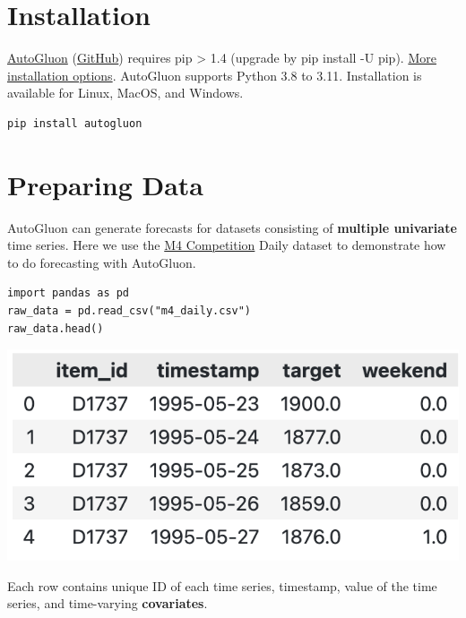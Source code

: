 \section*{Installation}
\href{https://auto.gluon.ai/stable/index.html}{AutoGluon} (\href{https://github.com/autogluon/autogluon/}{GitHub}) requires pip > 1.4 (upgrade by pip install -U pip). \href{https://auto.gluon.ai/stable/install.html}{More installation options}. AutoGluon supports Python 3.8 to 3.11. Installation is available for Linux, MacOS, and Windows.

\begin{verbatim}
pip install autogluon 
\end{verbatim}


\section*{Preparing Data}

AutoGluon can generate forecasts for datasets consisting of \textbf{multiple univariate} time series. Here we use the \href{https://www.sciencedirect.com/science/article/pii/S0169207019301128}{M4 Competition} Daily dataset to demonstrate how to do forecasting with AutoGluon.

\begin{verbatim}
import pandas as pd
raw_data = pd.read_csv("m4_daily.csv")
raw_data.head()
\end{verbatim}

\begin{center}
\includegraphics[width=0.6\linewidth]{timeseries/images/raw_data.png}
\end{center}

\medskip

Each row contains unique ID of each time series, timestamp, value of the time series, and time-varying \textbf{covariates}.

